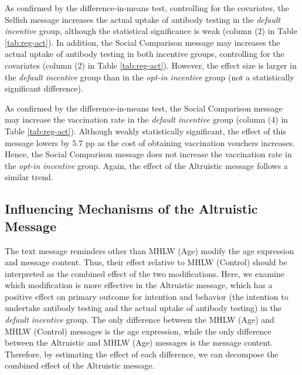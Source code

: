 \documentclass[
  11pt,
  a4paper
]{article}
\begin{document}
As confirmed by the difference-in-means test, controlling for the covariates, the Selfish message increases the actual uptake of antibody testing in the \emph{default incentive} group, although the statistical significance is weak (column (2) in Table \ref{tab:reg-act}). In addition, the Social Comparison message may increases the actual uptake of antibody testing in both incentive groups, controlling for the covariates (column (2) in Table \ref{tab:reg-act}). However, the effect size is larger in the \emph{default incentive} group than in the \emph{opt-in incentive} group (not a statistically significant difference).

As confirmed by the difference-in-means test, the Social Comparison message may increase the vaccination rate in the \emph{default incentive} group (column (4) in Table \ref{tab:reg-act}). Although weakly statistically significant, the effect of this message lowers by \(5.7\) pp as the cost of obtaining vaccination vouchers increases. Hence, the Social Comparison message does not increase the vaccination rate in the \emph{opt-in incentive} group. Again, the effect of the Altruistic message follows a similar trend.

\hypertarget{influencing-mechanisms-of-the-altruistic-message}{%
\subsection{Influencing Mechanisms of the Altruistic Message}\label{influencing-mechanisms-of-the-altruistic-message}}

The text message reminders other than MHLW (Age) modify the age expression and message content. Thus, their effect relative to MHLW (Control) should be interpreted as the combined effect of the two modifications. Here, we examine which modification is more effective in the Altruistic message, which has a positive effect on primary outcome for intention and behavior (the intention to undertake antibody testing and the actual uptake of antibody testing) in the \emph{default incentive} group. The only difference between the MHLW (Age) and MHLW (Control) messages is the age expression, while the only difference between the Altruistic and MHLW (Age) messages is the message content. Therefore, by estimating the effect of each difference, we can decompose the combined effect of the Altruistic message.
\end{document}
